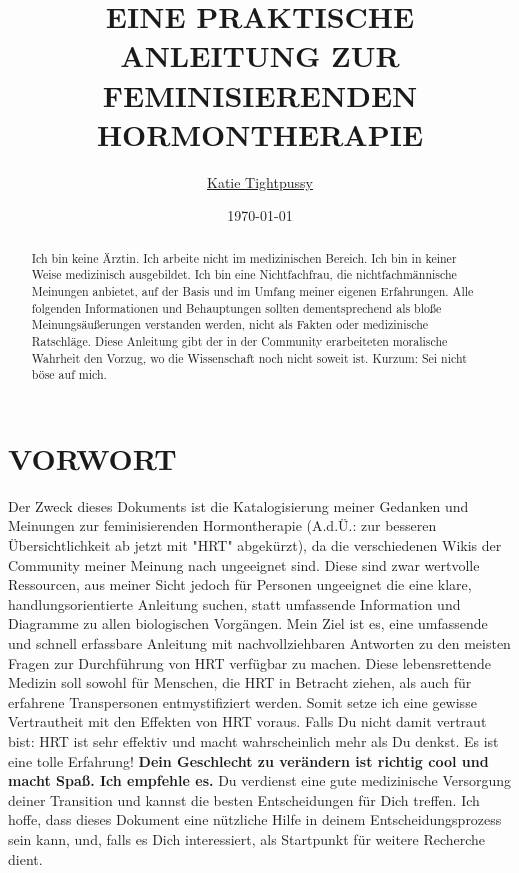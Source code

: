 \documentclass{article}
\title{EINE PRAKTISCHE ANLEITUNG ZUR FEMINISIERENDEN HORMONTHERAPIE}
\author{\href{https://katea.gay/}{Katie Tightpussy}}
\date{\today}
\begin{document}
\maketitle
\tableofcontents
								  

\begin{abstract}
    Ich bin keine Ärztin. Ich arbeite nicht im medizinischen Bereich. Ich bin in keiner Weise medizinisch ausgebildet. Ich bin eine Nichtfachfrau, die nichtfachmännische Meinungen anbietet, auf der Basis und im Umfang meiner eigenen Erfahrungen. Alle folgenden Informationen und Behauptungen sollten dementsprechend als bloße Meinungsäußerungen verstanden werden, nicht als Fakten oder medizinische Ratschläge. Diese Anleitung gibt der in der Community erarbeiteten moralische Wahrheit den Vorzug, wo die Wissenschaft noch nicht soweit ist. Kurzum: Sei nicht böse auf mich. 
\end{abstract}


\section{VORWORT}

Der Zweck dieses Dokuments ist die Katalogisierung meiner Gedanken und Meinungen zur feminisierenden Hormontherapie (A.d.Ü.: zur besseren Übersichtlichkeit ab jetzt mit "HRT" abgekürzt), da die verschiedenen Wikis der Community meiner Meinung nach ungeeignet sind. Diese sind zwar wertvolle Ressourcen, aus meiner Sicht jedoch für Personen ungeeignet die eine klare, handlungsorientierte Anleitung suchen, statt umfassende Information und Diagramme zu allen biologischen Vorgängen. Mein Ziel ist es, eine umfassende und schnell erfassbare Anleitung mit nachvollziehbaren Antworten zu den meisten Fragen zur Durchführung von HRT verfügbar zu machen. Diese lebensrettende Medizin soll sowohl für Menschen, die HRT in Betracht ziehen, als auch für erfahrene Transpersonen entmystifiziert werden. Somit setze ich eine gewisse Vertrautheit mit den Effekten von HRT voraus. Falls Du nicht damit vertraut bist: HRT ist sehr effektiv und macht wahrscheinlich mehr als Du denkst. Es ist eine tolle Erfahrung! \textbf{Dein Geschlecht zu verändern ist richtig cool und macht Spaß. Ich empfehle es.} Du verdienst eine gute medizinische Versorgung deiner Transition und kannst die besten Entscheidungen für Dich treffen. Ich hoffe, dass dieses Dokument eine nützliche Hilfe in deinem Entscheidungsprozess sein kann, und, falls es Dich interessiert, als Startpunkt für weitere Recherche dient.
\end{document}
